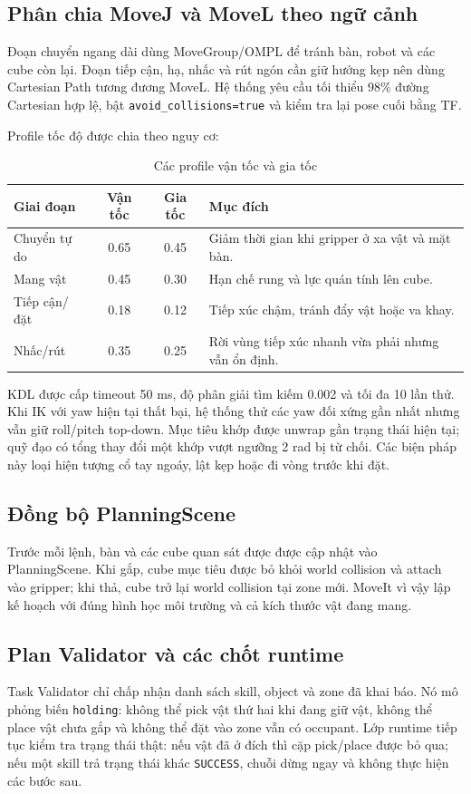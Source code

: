 \documentclass[a4paper,12pt]{article}
\newcommand{\code}[1]{\texttt{#1}}
\begin{document}
\subsection{Phân chia MoveJ và MoveL theo ngữ cảnh}
Đoạn chuyển ngang dài dùng MoveGroup/OMPL để tránh bàn, robot và các cube còn
lại. Đoạn tiếp cận, hạ, nhấc và rút ngón cần giữ hướng kẹp nên dùng Cartesian
Path tương đương MoveL. Hệ thống yêu cầu tối thiểu 98\% đường Cartesian hợp lệ,
bật \code{avoid\_collisions=true} và kiểm tra lại pose cuối bằng TF.

Profile tốc độ được chia theo nguy cơ:
\begin{table}[H]
\centering
\caption{Các profile vận tốc và gia tốc}
\label{tab:speeds}
\begin{tabular}{lccp{}}
\toprule
\textbf{Giai đoạn} & \textbf{Vận tốc} & \textbf{Gia tốc} & \textbf{Mục đích}\\
\midrule
Chuyển tự do & 0.65 & 0.45 & Giảm thời gian khi gripper ở xa vật và mặt bàn.\\
Mang vật & 0.45 & 0.30 & Hạn chế rung và lực quán tính lên cube.\\
Tiếp cận/đặt & 0.18 & 0.12 & Tiếp xúc chậm, tránh đẩy vật hoặc va khay.\\
Nhấc/rút & 0.35 & 0.25 & Rời vùng tiếp xúc nhanh vừa phải nhưng vẫn ổn định.\\
\bottomrule
\end{tabular}
\end{table}

KDL được cấp timeout 50 ms, độ phân giải tìm kiếm 0.002 và tối đa 10 lần thử.
Khi IK với yaw hiện tại thất bại, hệ thống thử các yaw đối xứng gần nhất nhưng
vẫn giữ roll/pitch top-down. Mục tiêu khớp được unwrap gần trạng thái hiện tại;
quỹ đạo có tổng thay đổi một khớp vượt ngưỡng 2 rad bị từ chối. Các biện pháp
này loại hiện tượng cổ tay ngoáy, lật kẹp hoặc đi vòng trước khi đặt.

\subsection{Đồng bộ PlanningScene}
Trước mỗi lệnh, bàn và các cube quan sát được được cập nhật vào PlanningScene.
Khi gắp, cube mục tiêu được bỏ khỏi world collision và attach vào gripper; khi
thả, cube trở lại world collision tại zone mới. MoveIt vì vậy lập kế hoạch với
đúng hình học môi trường và cả kích thước vật đang mang.

\subsection{Plan Validator và các chốt runtime}
Task Validator chỉ chấp nhận danh sách skill, object và zone đã khai báo. Nó mô
phỏng biến \code{holding}: không thể pick vật thứ hai khi đang giữ vật, không thể
place vật chưa gắp và không thể đặt vào zone vẫn có occupant. Lớp runtime tiếp
tục kiểm tra trạng thái thật: nếu vật đã ở đích thì cặp pick/place được bỏ qua;
nếu một skill trả trạng thái khác \code{SUCCESS}, chuỗi dừng ngay và không thực
hiện các bước sau.
\end{document}
